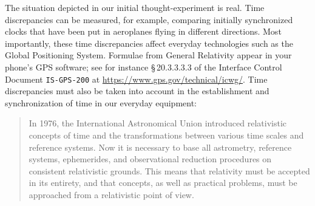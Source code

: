 \documentclass[a4paper,12pt,%
onecolumn,oneside,%
british%
]{memoir}
\renewcommand*{\|}[1][]{\nonscript\:#1\vert\nonscript\:\mathopen{}}
\newcommand*{\sect}{\S}%
\begin{document}
The situation depicted in our initial thought-experiment is real. Time discrepancies can be measured, for example, comparing initially synchronized clocks that have been put in aeroplanes flying in different directions. Most importantly, these time discrepancies affect everyday technologies such as the Global Positioning System. Formulae from General Relativity appear in your phone's GPS software; see for instance \sect\,20.3.3.3.3 of the Interface Control Document \texttt{IS-GPS-200} at \url{https://www.gps.gov/technical/icwg/}. Time discrepancies must also be taken into account in the establishment and synchronization of time in our everyday equipment:
\begin{quote}\footnotesize
  In 1976, the International Astronomical Union introduced relativistic concepts of time and the transformations between various time scales and reference systems. \textelp{} Now \textelp{} it is necessary to base all astrometry, reference systems, ephemerides, and observational reduction procedures on consistent relativistic grounds. This means that relativity must be accepted in its entirety, and that concepts, as well as practical problems, must be approached from a relativistic point of view.
\end{quote}
%
\end{document}
